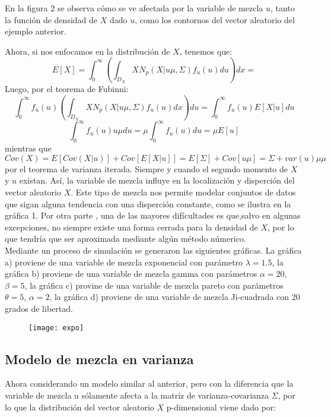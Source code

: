 \documentclass[11pt]{book}
\begin{document}
En la figura 2 se observa cómo se ve afectada por la variable de mezcla $u$, tanto la función de densidad de $X$ dado $u$, como los contornos del vector aleatorio del ejemplo anterior.\\
\pagebreak

Ahora, si nos enfocamos en la distribución de $X$, tenemos que: 
\begin{equation*}
E[X]=\int_{0}^{\infty}(\int_{D_{X}}XN_{p}(X|u\mu,\Sigma)f_{u}(u)du)dx=
\end{equation*}
Luego, por el teorema de Fubinni:
\begin{equation*}
\int_{0}^{\infty}f_{u}(u)(\int_{D_{X}}XN_{p}(X|u\mu,\Sigma)f_{u}(u)dx)du=\int_{0}^{\infty}f_{u}(u)E[X|u]du
\end{equation*}
\begin{equation*}
\int_{0}^{\infty}f_{u}(u)u\mu du=\mu\int_{0}^{\infty}f_{u}(u)du=\mu E[u]
\end{equation*}
 mientras que $Cov(X)=E[Cov(X|u)]+Cov[E[X|u]]=E[\Sigma]+Cov[u\mu]=\Sigma + var(u)\mu \mu\acute{}$ por el teorema de varianza iterada. Siempre y cuando el segundo momento de $X$ y $u$ existan. Así, la variable de mezcla influye en la localización y disperción del vector aleatorio $X$. Este tipo de mezcla nos permite modelar conjuntos de datos que sigan alguna tendencia con una disperción constante, como se ilustra en la gráfica 1. Por otra parte , una de las mayores difícultades es que,salvo en algunas excepciones, no siempre existe una forma cerrada para la densidad de $X$, por lo que tendría que ser aproximada mediante algún método númerico.\\

Mediante un proceso de simulación se generaron las siguientes gráficas. La gráfica a) proviene de una variable de mezcla exponencial con parámetro $\lambda=1.5$, la gráfica b) proviene de una variable de mezcla gamma con parámetros $\alpha=20$, $\beta=5$, la gráfica c) provine de una variable de mezcla pareto con parámetros $\theta=5$, $\alpha=2$, la gráfica d) proviene de una variable de mezcla Ji-cuadrada con 20 grados de libertad.\\

\begin{figure}[h]
\centering
\texttt{[image: expo]}
\end{figure}


\pagebreak
\subsection*{Modelo de mezcla en varianza}
Ahora considerando un modelo similar al anterior, pero con la diferencia que la variable de mezcla u sólamente afecta a la matriz de varianza-covarianza $\Sigma$, por lo que la distribución del vector aleatorio $X$ p-dimensional viene dado por:
\end{document}
